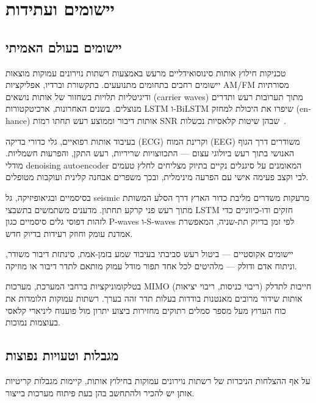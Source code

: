 \chapter{יישומים ועתידות}

\section{יישומים בעולם האמיתי}

טכניקות חילוץ אותות סינוסואידליים מרעש באמצעות רשתות נוירונים עמוקות מוצאות יישומים רחבים בתחומים מתנועעים. בתקשורת וברדיו, אפליקציות \textenglish{AM}/\textenglish{FM} מסורתיות ודיגיטליות תלויות בשחזור של אותות נושאים (\textenglish{carrier waves}) מתוך תערובות רעש ותדרים מנוצלים. בשנים האחרונות, ארכיטקטורות \textenglish{LSTM} ו-\textenglish{BiLSTM} שיפרו את היכולת למחזק (\textenglish{enhance}) אותות דיבור וממוצע רעש תחתו רמות \textenglish{SNR} שבהן שיטות קלאסיות נכשלות~\cite{wang2023survey_agents}.

בעיבוד אותות רפואיים, גלי כדורי בדיקה (\textenglish{ECG}) וקרינת המוח (\textenglish{EEG}) משודרים דרך הגוף האנושי בתוך רעש ביולוגי עצום --- התכווצויות שריריות, רעש התקן, והפרעות חשמליות. מודלי \textenglish{denoising autoencoder} המאומנים על סיגנלים נקיים בתיוק מצליחים לחלץ טעמים לבי וקצב פעימה אישי עם הפרעה מינימלית, ובכך משפרים אבחנה קלינית ועוקבות מטופלים.

בסיסמיים ובגיאופיזיקה, גל \textenglish{seismic} מרעקות משדרים מליבת כדור הארץ דרך הסלע המשותת מתוך רעש פני קרקע תחתון. מדענים משתמשים בתשבצי \textenglish{LSTM} חזקים ודו-כיווניים כדי לזהות דפוסי גלים סיסמיים כגון \textenglish{P-waves} ו-\textenglish{S-waves} לפי זמן בדיוק תת-שניה, המאפשרת אמדנת עומק וחוזק רעידות בדיוק חדש.

יישומים אקוסטיים --- ביטול רעש סביבתי בעיבוד שמע בזמן-אמת, סינתזת דיבור משודר, וניתוח אדם ודולק --- מלהיטים לכל אחד תפור מודל עמוק מותאם לתדר דיבור או מוזיקה.

בטלקומוניקציות ברחבי המערכת, מערכות \textenglish{MIMO} (ריבוי כניסות, ריבוי יציאות) חייבות לתדלק אותות שידור מרובים מאנטנות בודדות בעלות תדר זהה בערך. רשתות עמוקות הלומדות את כוח הערוץ מעל מספר סמלים רתוקים מחזירות ביצוע יתרון מול פוענוח ליניארי קלאסי בעוצמות נמוכות.

\section{מגבלות וטעויות נפוצות}

על אף ההצלחות הניכרות של רשתות נוירונים עמוקות בחילוץ אותות, קיימות מגבלות קריטיות אותן יש להכיר ולהתחשב בהן בעת פיתוח מערכות בייצור.


